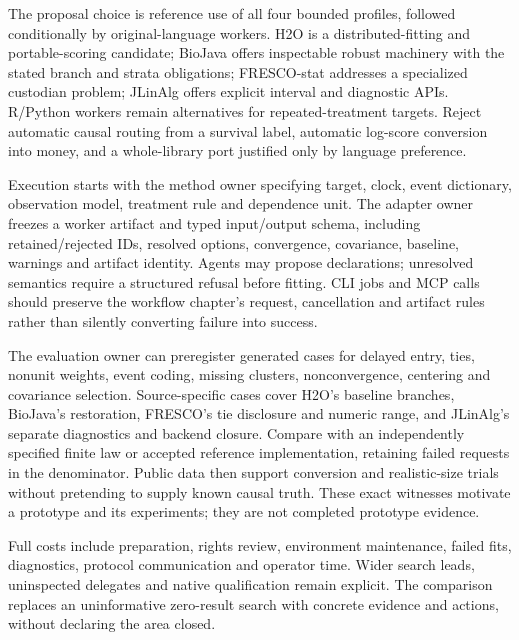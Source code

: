 The proposal choice is reference use of all four bounded profiles, followed
conditionally by original-language workers. H2O is a distributed-fitting and
portable-scoring candidate; BioJava offers inspectable robust machinery with
the stated branch and strata obligations; FRESCO-stat addresses a specialized
custodian problem; JLinAlg offers explicit interval and diagnostic APIs.
R/Python workers remain alternatives for repeated-treatment targets.
Reject automatic causal routing from a survival label, automatic log-score
conversion into money, and a whole-library port justified only by language
preference. \citep{exec24_longjava_h2o,exec24_longjava_biojava,exec24_longjava_fresco,exec24_longjava_jlinalg}

Execution starts with the method owner specifying target, clock, event
dictionary, observation model, treatment rule and dependence unit. The
adapter owner freezes a worker artifact and typed input/output schema,
including retained/rejected IDs, resolved options, convergence, covariance,
baseline, warnings and artifact identity. Agents may propose declarations;
unresolved semantics require a structured refusal before fitting. CLI jobs
and MCP calls should preserve the workflow chapter's request, cancellation
and artifact rules rather than silently converting failure into success.

The evaluation owner can preregister generated cases for delayed entry,
ties, nonunit weights, event coding, missing clusters, nonconvergence,
centering and covariance selection. Source-specific cases cover H2O's
baseline branches, BioJava's restoration, FRESCO's tie disclosure and numeric
range, and JLinAlg's separate diagnostics and backend closure. Compare with
an independently specified finite law or accepted reference implementation,
retaining failed requests in the denominator. Public data then support
conversion and realistic-size trials without pretending to supply known
causal truth. These exact witnesses motivate a prototype and its experiments;
they are not completed prototype evidence. \citep{exec24_longjava_reference}

Full costs include preparation, rights review, environment maintenance,
failed fits, diagnostics, protocol communication and operator time. Wider
search leads, uninspected delegates and native qualification remain explicit.
The comparison replaces an uninformative zero-result search with concrete
evidence and actions, without declaring the area closed.


